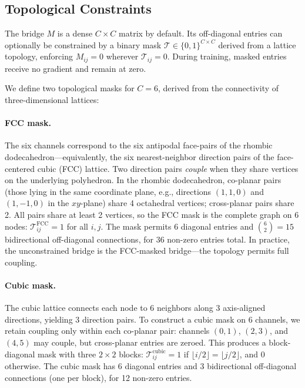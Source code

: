 \subsection{Topological Constraints}
\label{sec:topology}

The bridge $M$ is a dense $C \times C$ matrix by default.
Its off-diagonal entries can optionally be constrained by a binary
mask $\mathcal{T} \in \{0, 1\}^{C \times C}$ derived from a lattice
topology, enforcing $M_{ij} = 0$ wherever $\mathcal{T}_{ij} = 0$.
During training, masked entries receive no gradient and remain at zero.

We define two topological masks for $C = 6$, derived from the
connectivity of three-dimensional lattices:

\paragraph{FCC mask.}
The six channels correspond to the six antipodal face-pairs of the
rhombic dodecahedron---equivalently, the six nearest-neighbor direction
pairs of the face-centered cubic (FCC) lattice.
Two direction pairs \emph{couple} when they share vertices on the
underlying polyhedron.
In the rhombic dodecahedron, co-planar pairs (those lying in the same
coordinate plane, e.g., directions $(1,1,0)$ and $(1,-1,0)$ in the
$xy$-plane) share 4 octahedral vertices; cross-planar pairs share 2.
All pairs share at least 2 vertices, so the FCC mask is the complete
graph on 6 nodes: $\mathcal{T}^\text{FCC}_{ij} = 1$ for all $i, j$.
The mask permits 6 diagonal entries and $\binom{6}{2} = 15$
bidirectional off-diagonal connections, for 36 non-zero entries total.
In practice, the unconstrained bridge is the FCC-masked bridge---the
topology permits full coupling.

\paragraph{Cubic mask.}
The cubic lattice connects each node to 6 neighbors along 3
axis-aligned directions, yielding 3 direction pairs.
To construct a cubic mask on 6 channels, we retain coupling only
within each co-planar pair: channels $(0,1)$, $(2,3)$, and $(4,5)$
may couple, but cross-planar entries are zeroed.
This produces a block-diagonal mask with three $2 \times 2$ blocks:
$\mathcal{T}^\text{cubic}_{ij} = 1$ if $\lfloor i/2 \rfloor =
\lfloor j/2 \rfloor$, and 0 otherwise.
The cubic mask has 6 diagonal entries and 3 bidirectional off-diagonal
connections (one per block), for 12 non-zero entries.

